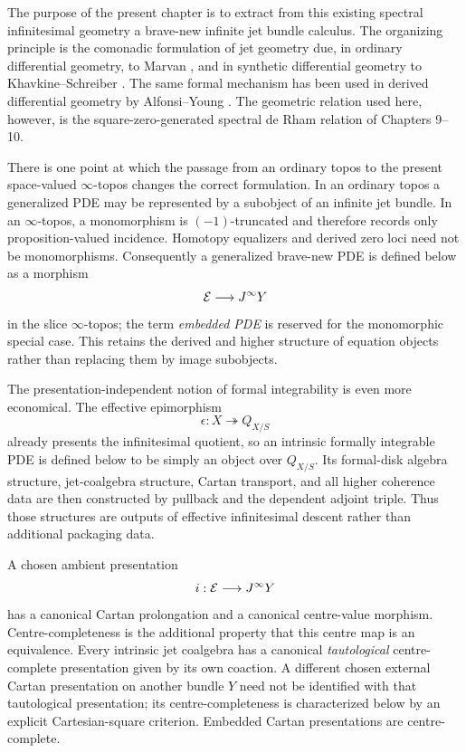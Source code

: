 The purpose of the present chapter is to extract from this existing spectral infinitesimal geometry a brave-new infinite jet bundle calculus.  The organizing principle is the comonadic formulation of jet geometry due, in ordinary differential geometry, to Marvan \cite{Marvan1986}, and in synthetic differential geometry to Khavkine--Schreiber \cite{KhavkineSchreiber2017}.  The same formal mechanism has been used in derived differential geometry by Alfonsi--Young \cite{AlfonsiYoung2023}.  The geometric relation used here, however, is the square-zero-generated spectral de Rham relation of Chapters 9--10.

There is one point at which the passage from an ordinary topos to the present space-valued $\infty$-topos changes the correct formulation.  In an ordinary topos a generalized PDE may be represented by a subobject of an infinite jet bundle.  In an $\infty$-topos, a monomorphism is $(-1)$-truncated and therefore records only proposition-valued incidence.  Homotopy equalizers and derived zero loci need not be monomorphisms.  Consequently a generalized brave-new PDE is defined below as a morphism
\[
    \mathcal E\longrightarrow J^{\infty} Y
\]
in the slice $\infty$-topos; the term \emph{embedded PDE} is reserved for the monomorphic special case.  This retains the derived and higher structure of equation objects rather than replacing them by image subobjects.

The presentation-independent notion of formal integrability is even more economical.  The effective epimorphism
\[
    \epsilon:X\twoheadrightarrow Q_{X/S}
\]
already presents the infinitesimal quotient, so an intrinsic formally integrable PDE is defined below to be simply an object over $Q_{X/S}$.  Its formal-disk algebra structure, jet-coalgebra structure, Cartan transport, and all higher coherence data are then constructed by pullback and the dependent adjoint triple.  Thus those structures are outputs of effective infinitesimal descent rather than additional packaging data.

A chosen ambient presentation
\[
    i:\mathcal E\longrightarrow J^{\infty} Y
\]
has a canonical Cartan prolongation and a canonical centre-value morphism.  Centre-completeness is the additional property that this centre map is an equivalence.  Every intrinsic jet coalgebra has a canonical \emph{tautological} centre-complete presentation given by its own coaction.  A different chosen external Cartan presentation on another bundle $Y$ need not be identified with that tautological presentation; its centre-completeness is characterized below by an explicit Cartesian-square criterion.  Embedded Cartan presentations are centre-complete.

